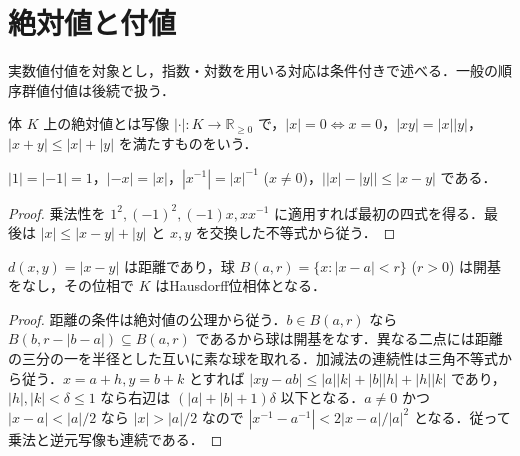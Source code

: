 \section{絶対値と付値}
実数値付値を対象とし，指数・対数を用いる対応は条件付きで述べる．一般の順序群値付値は後続で扱う．
\begin{defn}[絶対値]
体 $K$ 上の絶対値とは写像 $|\cdot|:K\to\mathbb R_{\geq0}$ で，$|x|=0\Leftrightarrow x=0$，$|xy|=|x||y|$，$|x+y|\leq |x|+|y|$ を満たすものをいう．
\end{defn}
\begin{prop}[絶対値の基本性質]
$|1|=|-1|=1$，$|-x|=|x|$，$|x^{-1}|=|x|^{-1}$ ($x\ne0$)，$\big||x|-|y|\big|\leq |x-y|$ である．
\end{prop}
\begin{proof}
乗法性を $1^2,(-1)^2,(-1)x,xx^{-1}$ に適用すれば最初の四式を得る．最後は $|x|\leq |x-y|+|y|$ と $x,y$ を交換した不等式から従う．
\end{proof}
\begin{prop}[絶対値による位相体]
$d(x,y)=|x-y|$ は距離であり，球 $B(a,r)=\{x:|x-a|<r\}$ ($r>0$) は開基をなし，その位相で $K$ はHausdorff位相体となる．
\end{prop}
\begin{proof}
距離の条件は絶対値の公理から従う．$b\in B(a,r)$ なら $B(b,r-|b-a|)\subseteq B(a,r)$ であるから球は開基をなす．異なる二点には距離の三分の一を半径とした互いに素な球を取れる．加減法の連続性は三角不等式から従う．$x=a+h,y=b+k$ とすれば $|xy-ab|\leq |a||k|+|b||h|+|h||k|$ であり，$|h|,|k|<\delta\leq1$ なら右辺は $(|a|+|b|+1)\delta$ 以下となる．$a\ne0$ かつ $|x-a|<|a|/2$ なら $|x|>|a|/2$ なので $|x^{-1}-a^{-1}|<2|x-a|/|a|^2$ となる．従って乗法と逆元写像も連続である．
\end{proof}
